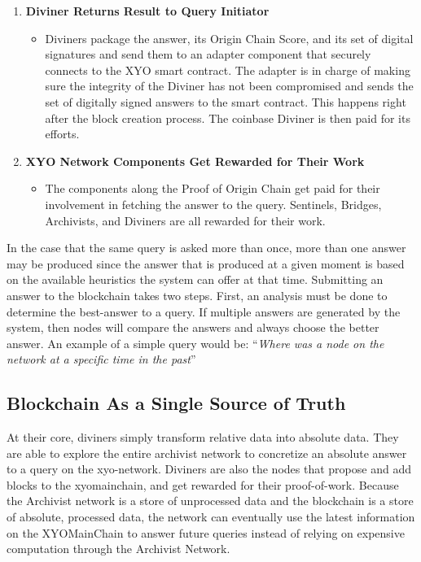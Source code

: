 \documentclass{article}
\begin{document}
\begin{enumerate}
\begin{itemize}
  \end{itemize}
  \item \textbf{Diviner Returns Result to Query Initiator}
  \begin{itemize}
    \item Diviners package the answer, its Origin Chain Score, and its set of digital signatures and send them to an adapter component that securely connects to the XYO smart contract. The adapter is in charge of making sure the integrity of the Diviner has not been compromised and sends the set of digitally signed answers to the smart contract. This happens right after the block creation process. The coinbase Diviner is then paid for its efforts.
  \end{itemize}
  \item \textbf{XYO Network Components Get Rewarded for Their Work}
  \begin{itemize}
    \item The components along the Proof of Origin Chain get paid for their involvement in fetching the answer to the query. Sentinels, Bridges, Archivists, and Diviners are all rewarded for their work.

  \end{itemize}
\end{enumerate}

In the case that the same query is asked more than once, more than one answer may be produced since the answer that is produced at a given moment is based on the available \glspl{heuristic} the system can offer at that time. Submitting an answer to the blockchain takes two steps. First, an analysis must be done to determine the \Gls{best-answer} to a query. If multiple answers are generated by the system, then nodes will compare the answers and always choose the better answer. An example of a simple query would be: ``\textit{Where was a node on the network at a specific time in the past}''

\subsection{Blockchain As a Single Source of Truth}

At their core, \Glspl{diviner} simply transform relative data into absolute data. They are able to explore the entire \Gls{archivist} network to concretize an absolute answer to a query on the \Gls{xyo-network}. Diviners are also the nodes that propose and add blocks to the \Gls{xyomainchain}, and get rewarded for their \Gls{proof-of-work}. Because the Archivist network is a store of unprocessed data and the blockchain is a store of absolute, processed data, the network can eventually use the latest information on the XYOMainChain to answer future queries instead of relying on expensive computation through the Archivist Network.
\end{document}
